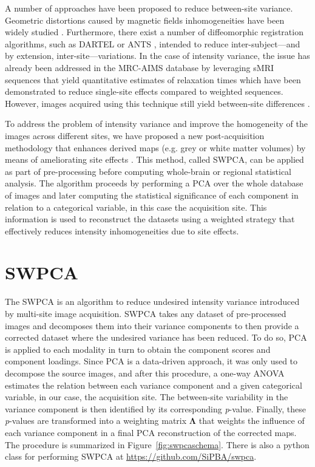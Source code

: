 A number of approaches have been proposed to reduce between-site variance. Geometric distortions caused by magnetic fields inhomogeneities have been widely studied \cite{Jovicich2006,Stonnington2008}. Furthermore, there exist a number of diffeomorphic registration algorithms, such as DARTEL \cite{Ashburner2007} or ANTS \cite{Avants2010}, intended to reduce inter-subject—and by extension, inter-site—variations. In the case of intensity variance, the issue has already been addressed in the \ac{MRC-AIMS} database by leveraging sMRI sequences that yield quantitative estimates of relaxation times \cite{deoni2008standardized} which have been demonstrated to reduce single-site effects compared to weighted sequences. However, images acquired using this technique still yield between-site differences \cite{Suckling2014}.

To address the problem of intensity variance and improve the homogeneity of the images across different sites, we have proposed a new post-acquisition methodology that enhances derived maps (e.g. grey or white matter volumes) by means of ameliorating site effects \cite{Martinez-Murcia2016a}. This method, called \acf{SWPCA}, can be applied as part of pre-processing before computing whole-brain or regional statistical analysis. The algorithm proceeds by performing a \ac{PCA} over the whole database of images and later computing the statistical significance of each component in relation to a categorical variable, in this case the acquisition site. This information is used to reconstruct the datasets using a weighted strategy that effectively reduces intensity inhomogeneities due to site effects.

\section{\acf{SWPCA}}
The \acf{SWPCA} is an algorithm to reduce undesired intensity variance introduced by multi-site image acquisition. \ac{SWPCA} takes any dataset of pre-processed images and decomposes them into their variance components to then provide a corrected dataset where the undesired variance has been reduced. To do so, \ac{PCA} is applied to each modality in turn to obtain the component scores and component loadings. Since \ac{PCA} is a data-driven approach, it was only used to decompose the source images, and after this procedure, a one-way \ac{ANOVA} estimates the relation between each variance component and a given categorical variable, in our case, the acquisition site. The between-site variability in the variance component is then identified by its corresponding \textit{p}-value. Finally, these \textit{p}-values are transformed into a weighting matrix  $\boldsymbol\Lambda$ that weights the influence of each variance component in a final \ac{PCA} reconstruction of the corrected maps. The procedure is summarized in Figure~\ref{fig:swpcaschema}. There is also a python class for performing \ac{SWPCA} at \url{https://github.com/SiPBA/swpca}. 

